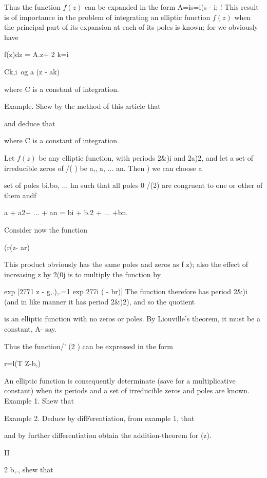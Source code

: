 {Thus the function $f(z)$ can be expanded in the form
A=is=i(s - i; !
This result is of importance in the problem of
integrating an elliptic function $f(z)$ when the principal part of its
expansion at each of its poles is known; for we obviously have

f(z)dz = A.z+ 2 k=i

Ck,i\ og a (z - ak)

where C is a constant of integration.

Example. Shew by the method of this article that

and deduce that

where C is a constant of integration.


Let $f(z)$ be any elliptic function, with periods 2\&)i and 2a)2, and
let a set of irreducible zeros of /( ) be a,, a, ... an. Then
) we can choose a

%
%

set of poles bi,bo, ... hn such that all poles 0 /(2) are congruent to
one or other of them andf

a + a2+ ... + an = bi + b.2 + ... +bn.

Consider now the function

  (r(z- ar)

This product obviously has the same poles and zeros as f z); also the
effect of increasing z by 2(0j is to multiply the function by

  exp [2771 z - g,.),.=1 exp 277i ( - br)] The function therefore has
period 2\&)i (and in like manner it has period 2\&)2), and so the
quotient

is an elliptic function with no zeros or poles. By Liouville's
theorem, it must be a constant, A- say.

Thus the function/' (2 ) can be expressed in the form

r=l(T Z-b,)

An elliptic function is consequently determinate (save for a
multiplicative constant) when its periods and a set of irreducible
zeros and poles are known. Example 1. Shew that

Example 2. Deduce by difFerentiation, from example 1, that

and by further differentiation obtain the addition-theorem for (z).

II

2 b,., shew that

}
